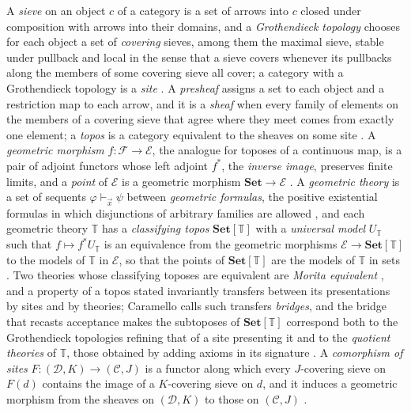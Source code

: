 \documentclass{lmcs}
\theoremstyle{definition}
\theoremstyle{remark}
\newcommand{\Tt}{\mathbb{T}}
\newcommand{\Set}{\mathbf{Set}}
\newcommand{\Clf}[1]{\Set[#1]}
\begin{document}
A \emph{sieve} on an object $c$ of a category is a set of arrows into $c$ closed under composition with arrows into
their domains, and a \emph{Grothendieck topology} chooses for each object a set of \emph{covering} sieves, among them
the maximal sieve, stable under pullback and local in the sense that a sieve covers whenever its
pullbacks along the members of some covering sieve all cover; a category with a Grothendieck topology is a
\emph{site} \cite[Expos\'e~II]{SGA4}. A \emph{presheaf} assigns a set to each
object and a restriction map to each arrow, and it is a \emph{sheaf} when every family of elements on the members of a
covering sieve that agree where they meet comes from exactly one element; a \emph{topos} is a category equivalent to
the sheaves on some site \cite[Expos\'e~IV]{SGA4}\cite{CL25a}.
A \emph{geometric morphism} $f\colon\mathcal F\to\mathcal E$, the analogue for toposes of a continuous map, is a pair
of adjoint functors whose left adjoint $f^\ast$, the \emph{inverse image}, preserves finite limits, and a \emph{point}
of $\mathcal E$ is a geometric morphism $\Set\to\mathcal E$
\cite{SGA4}\cite{CL25a}.
A \emph{geometric theory} is a set of sequents $\varphi\vdash_{\vec x}\psi$ between \emph{geometric formulas}, the
positive existential formulas in which disjunctions of arbitrary families are allowed
\cite{CL25a}, and each geometric theory $\Tt$ has a
\emph{classifying topos} $\Clf{\Tt}$ with a \emph{universal model} $U_{\Tt}$ such that $f\mapsto f^\ast U_{\Tt}$ is
an equivalence from the geometric morphisms $\mathcal E\to\Clf{\Tt}$ to the models of $\Tt$ in $\mathcal E$, so that
the points of $\Clf{\Tt}$ are the models of $\Tt$ in sets
\cite{CL25a}. Two theories whose classifying
toposes are equivalent are \emph{Morita equivalent}
\cite{CL25a}\cite{Caramello19},
and a property of a topos stated invariantly transfers between its presentations by sites and by theories; Caramello
calls such transfers \emph{bridges}, and the bridge that recasts acceptance makes the subtoposes of $\Clf{\Tt}$
correspond both to the Grothendieck topologies refining that of a site presenting it and to the \emph{quotient
theories} of $\Tt$, those obtained by adding axioms in its signature
\cite{CL25a,Caramello09}.
A \emph{comorphism of sites} $F\colon(\mathcal D,K)\to(\mathcal C,J)$ is a functor along which every $J$-covering
sieve on $F(d)$ contains the image of a $K$-covering sieve on $d$, and it induces a geometric morphism from the
sheaves on $(\mathcal D,K)$ to those on $(\mathcal C,J)$ \cite{Caramello19}.
\end{document}
